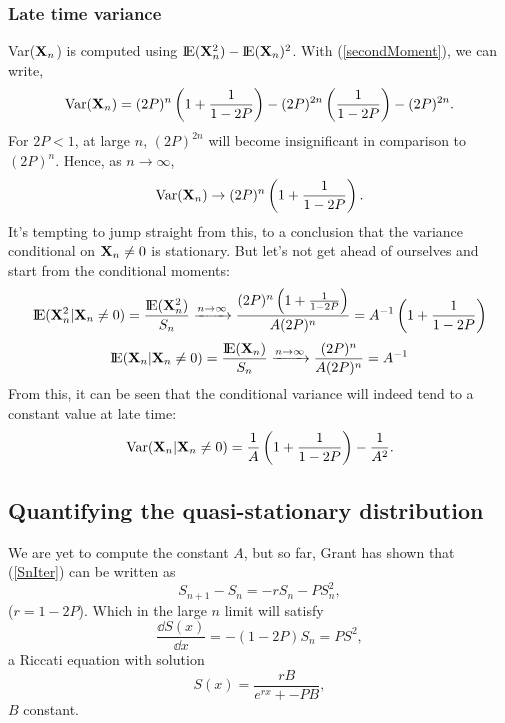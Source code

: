 \subsubsection{Late time variance}
Var(${\bf X}_n$) is computed using ${\rm I}\!{\rm E}({\bf X}_n^2) - {\rm I}\!{\rm E}({\bf X}_n)^2$. With (\ref{secondMoment}), we can write,
$$\text{Var}({\bf X}_n) = (2P)^n\left(1 + \frac{1}{1-2P}\right) - (2P)^{2n}\left(\frac{1}{1-2P}\right) - (2P)^{2n}.$$
For $2P < 1$, at large $n$, $(2P)^{2n}$ will become insignificant in comparison to $(2P)^n$. Hence, as $n\to\infty$,
$$\text{Var}({\bf X}_n) \to (2P)^n\left(1 + \frac{1}{1-2P}\right).$$
It's tempting to jump straight from this, to a conclusion that the variance conditional on ${\bf X}_n \neq 0 $ is stationary. But let's not get ahead of ourselves and start from the conditional moments:
$${\rm I}\!{\rm E}({\bf X}_n^2|{\bf X}_n\neq 0) = \frac{{\rm I}\!{\rm E}({\bf X}_n^2)}{S_n} \xrightarrow{n\to\infty}   \frac{(2P)^n\left(1 + \frac{1}{1-2P}\right)}{A(2P)^n} = A^{-1}\left(1 + \frac{1}{1-2P}\right)$$
$${\rm I}\!{\rm E}({\bf X}_n|{\bf X}_n\neq 0) =  \frac{{\rm I}\!{\rm E}({\bf X}_n)}{S_n}  \xrightarrow{n\to\infty}    \frac{(2P)^n}{A(2P)^n} = A^{-1}$$
From this, it can be seen that the conditional variance will indeed tend to a constant value at late time:
\begin{equation*}
\text{Var}({\bf X}_n|{\bf X}_n\neq0) = \frac{1}{A}\left(1+\frac{1}{1-2P}\right) - \frac{1}{A^2}.
\end{equation*}



\subsection{Quantifying the quasi-stationary distribution}

We are yet to compute the constant $A$, but so far, Grant has shown that (\ref{SnIter}) can be written as 
$$S_{n+1} - S_n = -rS_n - PS_n^2,$$
($r = 1-2P$). Which in the large $n$ limit will satisfy
$$\frac{\dd S(x)}{\dd x} = -(1-2P)S_n = PS^2,$$
a Riccati equation with solution
$$S(x) = \frac{rB}{e^{rx} +- PB},$$
$B$ constant. 




































